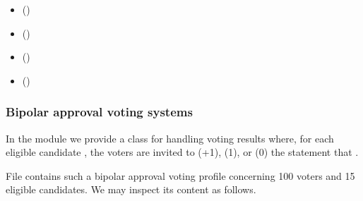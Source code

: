 \documentclass[a4paper,12pt,english]{sphinxhowto}
\begin{document}
\begin{sphinxcontents}
\begin{itemize}
\item {} 
\sphinxAtStartPar
{}\label{\detokenize{pearls:id130}}{\hyperref[\detokenize{pearls:bipolar-approval-voting-systems}]{}} ()

\item {} 
\sphinxAtStartPar
{}\label{\detokenize{pearls:id131}}{\hyperref[\detokenize{pearls:pairwise-comparison-of-bipolar-approval-votes}]{}} ()

\item {} 
\sphinxAtStartPar
{}\label{\detokenize{pearls:id132}}{\hyperref[\detokenize{pearls:three-valued-evaluative-voting-system}]{}} ()

\item {} 
\sphinxAtStartPar
{}\label{\detokenize{pearls:id133}}{\hyperref[\detokenize{pearls:favouring-multipartisan-candidates}]{}} ()

\end{itemize}
\end{sphinxcontents}


\subsubsection{Bipolar approval voting systems}
\label{\detokenize{pearls:bipolar-approval-voting-systems}}
\sphinxAtStartPar
In the  module we provide a  class for handling voting results where, for each eligible candidate , the voters are invited  to  (+1),  (\sphinxhyphen{}1), or  (0) the statement that .

\sphinxAtStartPar
File  contains such a bipolar approval voting profile concerning 100 voters and 15 eligible candidates. We may inspect its content as follows.
\end{document}

